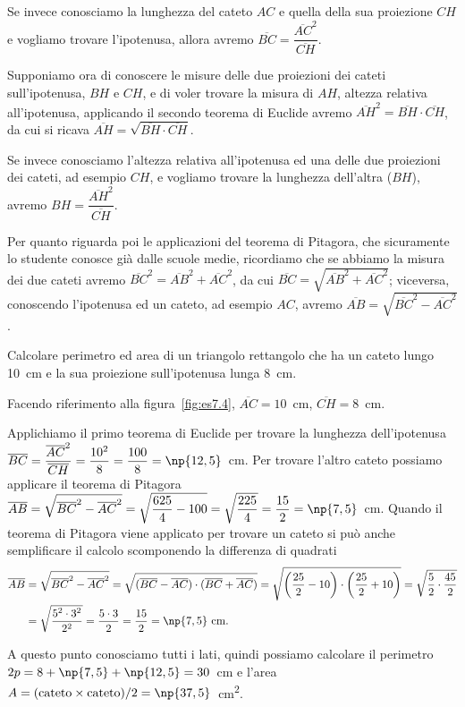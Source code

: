 Se invece conosciamo la lunghezza del cateto $AC$ e quella della sua 
proiezione $CH$ e vogliamo trovare l'ipotenusa, allora avremo 
$\overline{BC}=\dfrac{\overline{AC}^2}{\overline{CH}}$.

Supponiamo ora di conoscere le misure delle due proiezioni dei cateti 
sull'ipotenusa, $BH$ e $CH$, e di voler trovare la misura di $AH$, 
altezza relativa all'ipotenusa, applicando il secondo teorema di 
Euclide avremo $\overline{AH}^2=\overline{BH}\cdot \overline{CH}$, da 
cui si ricava $\overline{AH}=\sqrt{\overline{BH}\cdot\overline{CH}}$.

Se invece conosciamo l'altezza relativa all'ipotenusa ed una delle 
due proiezioni dei cateti, ad esempio $CH$, e vogliamo trovare la 
lunghezza dell'altra ($BH$), avremo 
$BH=\dfrac{\overline{AH}^2}{\overline{CH}}$.

Per quanto riguarda poi le applicazioni del teorema di Pitagora, che 
sicuramente lo studente conosce già dalle scuole medie, ricordiamo 
che se abbiamo la misura dei due cateti avremo 
$\overline{BC}^2=\overline{AB}^2+\overline{AC}^2$, da cui 
$\overline{BC}=\sqrt{\overline{AB}^2+\overline{AC}^2}$; viceversa, 
conoscendo l'ipotenusa ed un cateto, ad esempio $AC$, avremo 
$\overline{AB}=\sqrt{\overline{BC}^2-\overline{AC}^2}$.

\begin{esempio}\label{es:7.4}
Calcolare perimetro ed area di un triangolo rettangolo che ha un 
cateto lungo 10~cm e la sua proiezione sull'ipotenusa lunga 
8~cm.\vspace{7pt}

Facendo riferimento alla figura~\ref{fig:es7.4}, 
$\overline{AC}=10$~cm, $\overline{CH}=8$~cm.

Applichiamo il primo teorema di Euclide per trovare la lunghezza 
dell'ipotenusa 
$\overline{BC}=\dfrac{\overline{AC}^2}{\overline{CH}}=\dfrac{10^2}{8}
=\dfrac{100}{8}=\np{12,5}$~cm. Per trovare l'altro cateto possiamo 
applicare il teorema di Pitagora 
$\overline{AB}=\sqrt{\overline{BC}^2-\overline{AC}^2}=\sqrt{\dfrac{625
}{4}-100}=\sqrt{\dfrac{225}{4}}=\dfrac{15}{2}=\np{7,5}$~cm.
Quando il teorema di Pitagora viene applicato per trovare un cateto 
si può anche semplificare il calcolo scomponendo la differenza di 
quadrati
\begin{align*}
\overline{AB}&=\sqrt{\overline{BC}^2-\overline{AC}^2}=\sqrt{(\overline
{BC}-\overline{AC})\cdot(\overline{BC}+\overline{AC})}=\sqrt{
\left(\dfrac{25}{2}-10\right)\cdot\left(\dfrac{25}{2}+10\right)}=\sqrt
{\dfrac{5}{2}\cdot\dfrac{45}{2}}\\
&=\sqrt{\dfrac{5^2\cdot 3^2}{2^2}}=\dfrac{5\cdot 
3}{2}=\dfrac{15}{2}=\np{7,5}\text{~cm.}
\end{align*}

A questo punto conosciamo tutti i lati, quindi possiamo calcolare il 
perimetro $2p=8+\np{7,5}+\np{12,5}=30$~cm e l'area 
$A=(\text{cateto}\times\text{cateto})/2 = 
\np{37,5}$~cm\textsuperscript{2}.
\end{esempio}


